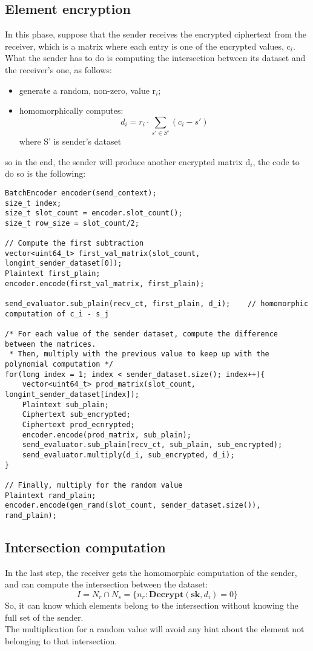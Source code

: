 \documentclass[12pt]{extarticle}
\begin{document}
\subsection{Element encryption}
In this phase, suppose that the sender receives the encrypted ciphertext from the receiver, which is a matrix where each entry is one of the encrypted values, c$_i$.\\What the sender has to do is computing the intersection between its dataset and the receiver's one, as follows:
\begin{itemize}
    \item generate a random, non-zero, value r$_i$;
    \item homomorphically computes:
        \begin{equation}
            d_i = r_i \cdot \sum\limits_{s' \in S'} (c_i - s') 
        \end{equation}
    where S' is sender's dataset
\end{itemize}
so in the end, the sender will produce another encrypted matrix d$_i$, the code to do so is the following:
\newpage
\begin{lstlisting}
BatchEncoder encoder(send_context);
size_t index;
size_t slot_count = encoder.slot_count();
size_t row_size = slot_count/2;

// Compute the first subtraction
vector<uint64_t> first_val_matrix(slot_count, longint_sender_dataset[0]);
Plaintext first_plain;
encoder.encode(first_val_matrix, first_plain);
		
send_evaluator.sub_plain(recv_ct, first_plain, d_i);	// homomorphic computation of c_i - s_j

/* For each value of the sender dataset, compute the difference between the matrices. 
 * Then, multiply with the previous value to keep up with the polynomial computation */
for(long index = 1; index < sender_dataset.size(); index++){
	vector<uint64_t> prod_matrix(slot_count, longint_sender_dataset[index]);
	Plaintext sub_plain;
	Ciphertext sub_encrypted; 
	Ciphertext prod_ecnrypted;
	encoder.encode(prod_matrix, sub_plain);
	send_evaluator.sub_plain(recv_ct, sub_plain, sub_encrypted);
	send_evaluator.multiply(d_i, sub_encrypted, d_i);
}
		
// Finally, multiply for the random value
Plaintext rand_plain;
encoder.encode(gen_rand(slot_count, sender_dataset.size()), rand_plain);	
\end{lstlisting}

\subsection{Intersection computation}
In the last step, the receiver gets the homomorphic computation of the sender, and can compute the intersection between the dataset:
\begin{equation}
    I = N_r \cap N_s = \{n_r: \textbf{Decrypt}(\textbf{sk}, d_i) = 0\}
\end{equation}
So, it can know which elements belong to the intersection without knowing the full set of the sender.\\
The multiplication for a random value will avoid any hint about the element not belonging to that intersection.
\end{document}
